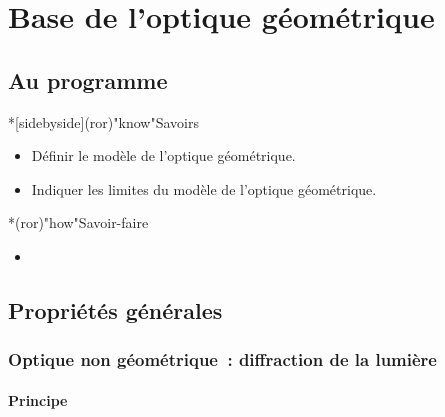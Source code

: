 \documentclass[../../main/main.tex]{subfiles}
\begin{document}
\setcounter{chapter}{1}

\chapter{Base de l'optique g\'eom\'etrique}

\section*{Au programme}

\begin{tcb}*[sidebyside](ror)"know"{Savoirs}
	\begin{itemize}[label=$\diamond$, leftmargin=10pt]
		\item Définir le modèle de l'optique géométrique.
	\end{itemize}
	\tcblower
	\begin{itemize}[label=$\diamond$, leftmargin=10pt]
		\item Indiquer les limites du modèle de l'optique géométrique.
	\end{itemize}
\end{tcb}

\begin{tcb}*(ror)"how"{Savoir-faire}
	\begin{itemize}[label=$\diamond$, leftmargin=10pt]
		\item 
	\end{itemize}
\end{tcb}

\section{Propriétés générales}
\subsection{Optique non géométrique~: diffraction de la lumière}
\subsubsection{Principe}
\end{document}
